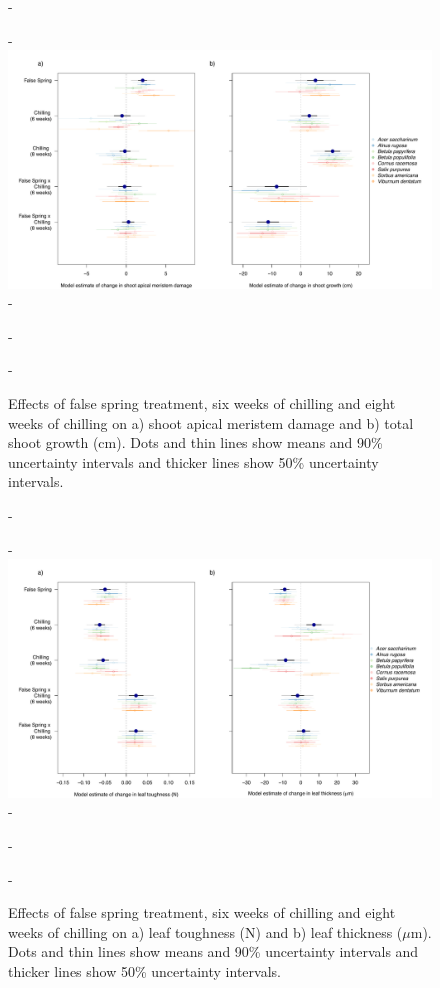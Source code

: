 \documentclass{article}\usepackage[]{graphicx}\usepackage[]{color}
\begin{document}
  {\begin{figure} [H]
  -\begin{center}
  -\includegraphics[width=18cm]{..//analyses/figures/mu_growth.pdf} 
  -\caption{Effects of false spring treatment, six weeks of chilling and eight weeks of chilling on a) shoot apical meristem damage and b) total shoot growth (cm). Dots and thin lines show means and 90\% uncertainty intervals and thicker lines show 50\% uncertainty intervals. }\label{fig:mugrowth}
  -\end{center}
  -\end{figure}}
  
  {\begin{figure} [H]
  -\begin{center}
  -\includegraphics[width=18cm]{..//analyses/figures/mu_leaftraits.pdf} 
  -\caption{Effects of false spring treatment, six weeks of chilling and eight weeks of chilling on a) leaf toughness (N) and b) leaf thickness ($\mu$m). Dots and thin lines show means and 90\% uncertainty intervals and thicker lines show 50\% uncertainty intervals. }\label{fig:muleaf}
  -\end{center}
  -\end{figure}}
  
\end{document}
